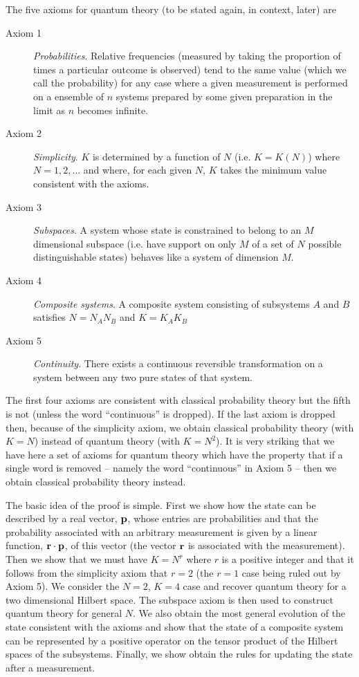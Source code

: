 \documentclass[12pt]{article}
\begin{document}
The five
axioms for quantum theory (to be stated again, in context, later) are
\begin{description}
\item[Axiom 1] {\it Probabilities}.  Relative frequencies (measured by
taking the proportion of times a particular outcome is observed)
tend to the same value (which we call the probability) for any case
where a given measurement is performed on a ensemble of $n$ systems
prepared by some given preparation in the limit as $n$ becomes infinite.
\item[Axiom 2] {\it Simplicity}. $K$ is determined by a function of
$N$ (i.e. $K=K(N)$) where $N=1,2,\dots$ and where, for each
given $N$, $K$ takes the minimum value consistent with the axioms.
\item[Axiom 3] {\it Subspaces}. A system whose state is constrained to
belong to an $M$
dimensional subspace (i.e. have support on only $M$ of a set of $N$ possible
distinguishable states) behaves like a system of dimension $M$.
\item[Axiom 4]  {\it Composite systems}. A composite system consisting of
subsystems $A$ and $B$ satisfies $N=N_AN_B$ and $K=K_AK_B$
\item[Axiom 5] {\it Continuity}. There exists a continuous reversible
transformation on a system between any two pure states of that
system.
\end{description}
The first four axioms are consistent with classical probability theory
but the fifth is not (unless the word ``continuous'' is dropped).
If the last axiom is dropped then, because of the
simplicity axiom, we obtain
classical probability theory (with $K=N$) instead of quantum theory
(with $K=N^2$).
It is very striking that we have here a set of axioms for quantum theory
which have the property that if a
single word is removed -- namely the word ``continuous'' in Axiom 5 --
then we obtain classical probability theory instead.



The basic idea of the proof is simple.  First we show how the state can
be described by a real vector, ${\bf p}$, whose entries are
probabilities and that the
probability associated with an arbitrary measurement is given by a linear
function, ${\bf r}\cdot {\bf p}$, of this vector (the vector ${\bf r}$
is associated with the measurement).  Then we show that we must have $K=N^r$
where $r$ is
a positive integer and that it follows from the simplicity axiom that
$r=2$ (the $r=1$ case being ruled out by Axiom 5). We consider the
$N=2$, $K=4$ case and recover quantum
theory for a two dimensional Hilbert space. The subspace axiom is then
used to construct quantum theory for general $N$.  We also obtain the
most general evolution of the state consistent with the axioms and show
that the state of a composite system can be represented by a positive
operator on the tensor product of the Hilbert spaces of the subsystems.
Finally, we show obtain the rules for updating the state after a
measurement.
\end{document}
